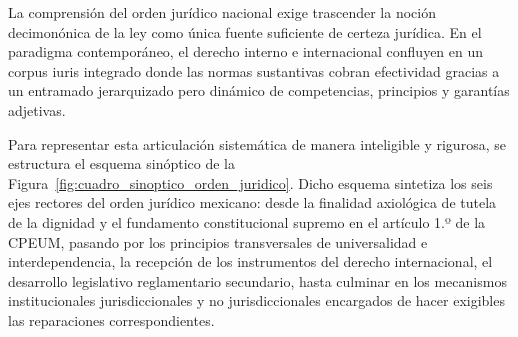 \documentclass[12pt,spanish,letterpaper,oneside]{article}
\begin{document}
La comprensi\'on del orden jur\'idico nacional exige trascender la noci\'on decimon\'onica de la ley como \'unica fuente suficiente de certeza jur\'idica. En el paradigma contempor\'aneo, el derecho interno e internacional confluyen en un corpus iuris integrado donde las normas sustantivas cobran efectividad gracias a un entramado jerarquizado pero din\'amico de competencias, principios y garant\'ias adjetivas. 

Para representar esta articulaci\'on sistem\'atica de manera inteligible y rigurosa, se estructura el esquema sin\'optico de la Figura~\ref{fig:cuadro_sinoptico_orden_juridico}. Dicho esquema sintetiza los seis ejes rectores del orden jur\'idico mexicano: desde la finalidad axiol\'ogica de tutela de la dignidad y el fundamento constitucional supremo en el art\'iculo 1.º de la CPEUM, pasando por los principios transversales de universalidad e interdependencia, la recepci\'on de los instrumentos del derecho internacional, el desarrollo legislativo reglamentario secundario, hasta culminar en los mecanismos institucionales jurisdiccionales y no jurisdiccionales encargados de hacer exigibles las reparaciones correspondientes.
\end{document}

